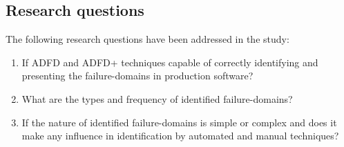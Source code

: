 \documentclass[runningheads,a4paper]{llncs}
\begin{document}
\subsection{Research questions} \label{sec:questions}
The following research questions have been addressed in the study:
\begin{enumerate}
%
\item If ADFD and ADFD+ techniques capable of correctly identifying and presenting the failure-domains in production software? %

%
%
\item What are the types and frequency of identified failure-domains? %
%
\item If the nature of identified failure-domains is simple or complex and does it make any influence in identification by automated and manual techniques? %

%


\end{enumerate}
\end{document}
